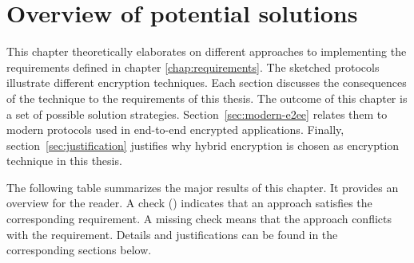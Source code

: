 \documentclass[../main.tex]{subfiles}
\begin{document}
\chapter{Overview of potential solutions}
\label{chap:overview}

This chapter theoretically elaborates on different approaches to implementing the requirements defined in chapter \ref{chap:requirements}.
The sketched protocols illustrate different encryption techniques.
Each section discusses the consequences of the technique to the requirements of this thesis.
The outcome of this chapter is a set of possible solution strategies.
Section~\ref{sec:modern-e2ee} relates them to modern protocols used in end-to-end encrypted applications. 
Finally, section~\ref{sec:justification} justifies why hybrid encryption is chosen as encryption technique in this thesis.

The following table summarizes the major results of this chapter.
It provides an overview for the reader.
A check (\checkmark) indicates that an approach satisfies the corresponding requirement.
A missing check means that the approach conflicts with the requirement.
Details and justifications can be found in the corresponding sections below.
\end{document}
